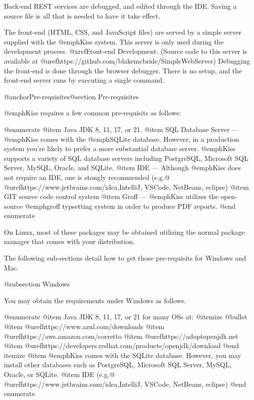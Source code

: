 Back-end REST services are debugged, and edited through the IDE.
Saving a source file is all that is needed to have it take effect.

The front-end (HTML, CSS, and JavaScript files) are served by a simple
server supplied with the @emph{Kiss} system.  This server is only used
during the development process.  @xref{Front-end Development}.
(Source code to this server is available at
@uref{https://github.com/blakemcbride/SimpleWebServer}) Debugging the
front-end is done through the browser debugger.  There is no setup,
and the front-end server runs by executing a single command.

@anchor{Pre-requisites}@section Pre-requisites

@emph{Kiss} requires a few common pre-requisits as follows:


@enumerate
@item
Java JDK 8, 11, 17, or 21. 
@item
SQL Database Server --- @emph{Kiss} comes with the @emph{SQLite} database.  However, in a production
system you're likely to prefer a more substantial database server.  @emph{Kiss} supports a variety of SQL database servers including 
PostgreSQL, Microsoft SQL Server, MySQL, Oracle, and SQLite.
@item
IDE --- Although @emph{Kiss} does not require an IDE, one is stongly recommended (e.g.@ @uref{https://www.jetbrains.com/idea,IntelliJ}, VSCode, NetBeans, eclipse)
@item
GIT source code control system
@item
Groff --- @emph{Kiss} utilizes the open-source @emph{groff} typsetting system in order to produce PDF reports.
@end enumerate

On Linux, most of these packages may be obtained utilizing the normal
package manager that comes with your distribution.

The following sub-sections detail how to get those pre-requisits for Windows and Mac.

@subsection Windows


You may obtain the requirements under Windows as follows.

@enumerate
@item
Java JDK 8, 11, 17, or 21 for many OSs at:
@itemize @bullet
@item
@uref{https://www.azul.com/downloads}
@item
@uref{https://aws.amazon.com/corretto}
@item
@uref{https://adoptopenjdk.net}
@item
@uref{https://developers.redhat.com/products/openjdk/download}
@end itemize
@item
@emph{Kiss} comes with the SQLite database.  However, you may install other databases such as PostgreSQL, Microsoft SQL Server, MySQL,
Oracle, or SQLite.
@item
IDE (e.g.@ @uref{https://www.jetbrains.com/idea,IntelliJ}, VSCode, NetBeans, eclipse)
@end enumerate

